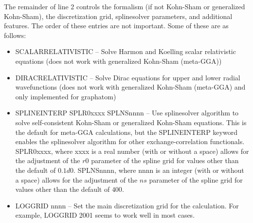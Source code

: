 \documentclass[11pt]{article}
\begin{document}
\begin{itemize}
		
		The remainder of line 2 controls the formalism (if not Kohn-Sham or
		generalized Kohn-Sham), the discretization grid, splinesolver parameters,
		and additional features.  The order of these entries are not important.
		Some of these are as follows:
		\begin{itemize}
		\item SCALARRELATIVISTIC --   Solve Harmon and Koelling scalar relativistic
		  equations  (does not work with generalized Kohn-Sham (meta-GGA))
		\item DIRACRELATIVISTIC  -- Solve Dirac equations for upper and lower 
		  radial wavefunctions (does not work with generalized Kohn-Sham (meta-GGA)
		  and only implemented for graphatom)
		\item SPLINEINTERP SPLR0xxxx  SPLNSnnnn -- Use splinesolver algorithm
		  to solve self-consistent Kohn-Sham or generalized  Kohn-Sham equations.
		  This is the default  for meta-GGA calculations, but the SPLINEINTERP 
		  keyword enables the splinesolver algorithm for other exchange-correlation
		  functionals. SPLR0xxxx, where xxxx is a real number (with or without
		  a space) allows for the adjustment of the $r0$ parameter of the spline
		  grid for values other than the default of $0.1d0$.
		    SPLNSnnnn, where nnnn is an integer (with or without
		  a space) allows for the adjustment of the $ns$ parameter of the spline
		  grid for values other than the default of $400$.
		\item LOGGRID  nnnn   --  Set the main discretization grid for the
		  calculation.   For example,  LOGGRID 2001 seems to work well in most cases.
		\end{itemize}
		

\end{itemize}
\end{document}
